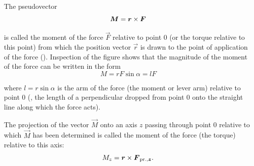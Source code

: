 The pseudovector
\begin{equation}\label{eq:3_112}
\boldsymbol{M} = \boldsymbol{r}\times\boldsymbol{F}
\end{equation}

\noindent
is called the moment of the force $\vec{F}$ relative to point $0$ (or the torque relative to this point) from which the position vector $\vec{r}$ is drawn to the point of application of the force (). Inspection of the figure shows that the magnitude of the moment of the force can be written in the form
\begin{equation}\label{eq:3_113}
M = rF\sin\alpha = lF
\end{equation}

\noindent
where $l=r\sin\alpha$ is the arm of the force (the moment or lever arm) relative to point $0$ (\ie, the length of a perpendicular dropped from point $0$ onto the straight line along which the force acts).

The projection of the vector $\vec{M}$ onto an axis $z$ passing through point $0$ relative to which $\vec{M}$ has been determined is called the moment of the force (the torque) relative to this axis:
\begin{equation}\label{eq:3_114}
M_z = \boldsymbol{r}\times\boldsymbol{F}_{\text{pr.},\boldsymbol{z}}.
\end{equation}

